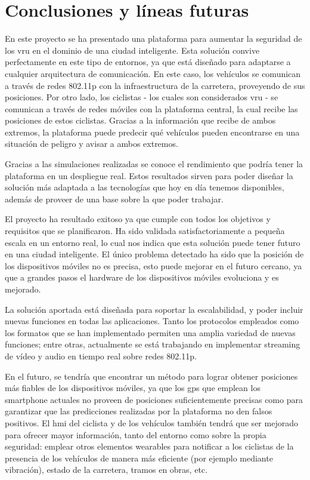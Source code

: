 \chapter{Conclusiones y líneas futuras}
En este proyecto se ha presentado una plataforma para aumentar la seguridad de los \gls{vru} en el dominio de una ciudad inteligente. Esta solución convive perfectamente en este tipo de entornos, ya que está diseñado para adaptarse a cualquier arquitectura de comunicación. En este caso, los vehículos se comunican a través de redes \gls{802.11p} con la infraestructura de la carretera, proveyendo de sus posiciones. Por otro lado, los ciclistas - los cuales son considerados \gls{vru} - se comunican a través de redes móviles con la plataforma central, la cual recibe las posiciones de estos ciclistas. Gracias a la información que recibe de ambos extremos, la plataforma puede predecir qué vehículos pueden encontrarse en una situación de peligro y avisar a ambos extremos.

Gracias a las simulaciones realizadas se conoce el rendimiento que podría tener la plataforma en un despliegue real. Estos resultados sirven para poder diseñar la solución más adaptada a las tecnologías que hoy en día tenemos disponibles, además de proveer de una base sobre la que poder trabajar. 

El proyecto ha resultado exitoso ya que cumple con todos los objetivos y requisitos que se planificaron. Ha sido validada satisfactoriamente a pequeña escala en un entorno real, lo cual nos indica que esta solución puede tener futuro en una ciudad inteligente. El único problema detectado ha sido que la posición de los dispositivos móviles no es precisa, esto puede mejorar en el futuro cercano, ya que a grandes pasos el hardware de los dispositivos móviles evoluciona y es mejorado. 

La solución aportada está diseñada para soportar la escalabilidad, y poder incluir nuevas funciones en todas las aplicaciones. Tanto los protocolos empleados como los formatos que se han implementado permiten una amplia variedad de nuevas funciones; entre otras, actualmente se está trabajando en implementar streaming de vídeo y audio en tiempo real sobre redes \gls{802.11p}.

En el futuro, se tendría que encontrar un método para lograr obtener posiciones más fiables de los dispositivos móviles, ya que los \gls{gps} que emplean los smartphone actuales no proveen de posiciones suficientemente precisas como para garantizar que las predicciones realizadas por la plataforma no den falsos positivos. El \gls{hmi} del ciclista y de los vehículos también tendrá que ser mejorado para ofrecer mayor información, tanto del entorno como sobre la propia seguridad: emplear otros elementos wearables para notificar a los ciclistas de la presencia de los vehículos de manera más eficiente (por ejemplo mediante vibración), estado de la carretera, tramos en obras, etc.